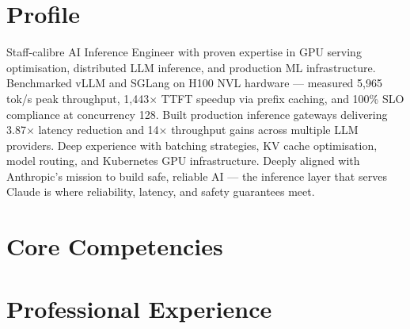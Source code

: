 \documentclass[11pt,a4paper]{moderncv}
\begin{document}
\makecvtitle

\section{Profile}
Staff-calibre AI Inference Engineer with proven expertise in GPU serving optimisation, distributed LLM inference, and production ML infrastructure. Benchmarked vLLM and SGLang on H100 NVL hardware — measured 5,965 tok/s peak throughput, 1,443$\times$ TTFT speedup via prefix caching, and 100\% SLO compliance at concurrency 128. Built production inference gateways delivering 3.87$\times$ latency reduction and 14$\times$ throughput gains across multiple LLM providers. Deep experience with batching strategies, KV cache optimisation, model routing, and Kubernetes GPU infrastructure. Deeply aligned with Anthropic's mission to build safe, reliable AI — the inference layer that serves Claude is where reliability, latency, and safety guarantees meet.

\section{Core Competencies}

\section{Professional Experience}
\end{document}
